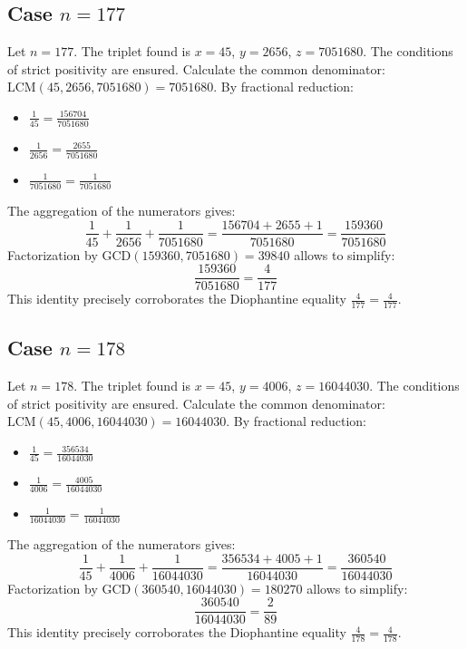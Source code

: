 \documentclass[11pt,a4paper]{article}
\begin{document}
\subsection{Case $n = 177$}
Let $n = 177$. The triplet found is $x = 45$, $y = 2656$, $z = 7051680$.
The conditions of strict positivity are ensured.
Calculate the common denominator: $\text{LCM}(45, 2656, 7051680) = 7051680$.
By fractional reduction:
\begin{itemize}
    \item $\frac{1}{45} = \frac{156704}{7051680}$
    \item $\frac{1}{2656} = \frac{2655}{7051680}$
    \item $\frac{1}{7051680} = \frac{1}{7051680}$
\end{itemize}
The aggregation of the numerators gives:
$$ \frac{1}{45} + \frac{1}{2656} + \frac{1}{7051680} = \frac{156704 + 2655 + 1}{7051680} = \frac{159360}{7051680} $$
Factorization by $\text{GCD}(159360, 7051680) = 39840$ allows to simplify:
$$ \frac{159360}{7051680} = \frac{4}{177} $$
This identity precisely corroborates the Diophantine equality $\frac{4}{177} = \frac{4}{177}$.

\subsection{Case $n = 178$}
Let $n = 178$. The triplet found is $x = 45$, $y = 4006$, $z = 16044030$.
The conditions of strict positivity are ensured.
Calculate the common denominator: $\text{LCM}(45, 4006, 16044030) = 16044030$.
By fractional reduction:
\begin{itemize}
    \item $\frac{1}{45} = \frac{356534}{16044030}$
    \item $\frac{1}{4006} = \frac{4005}{16044030}$
    \item $\frac{1}{16044030} = \frac{1}{16044030}$
\end{itemize}
The aggregation of the numerators gives:
$$ \frac{1}{45} + \frac{1}{4006} + \frac{1}{16044030} = \frac{356534 + 4005 + 1}{16044030} = \frac{360540}{16044030} $$
Factorization by $\text{GCD}(360540, 16044030) = 180270$ allows to simplify:
$$ \frac{360540}{16044030} = \frac{2}{89} $$
This identity precisely corroborates the Diophantine equality $\frac{4}{178} = \frac{4}{178}$.
\end{document}
